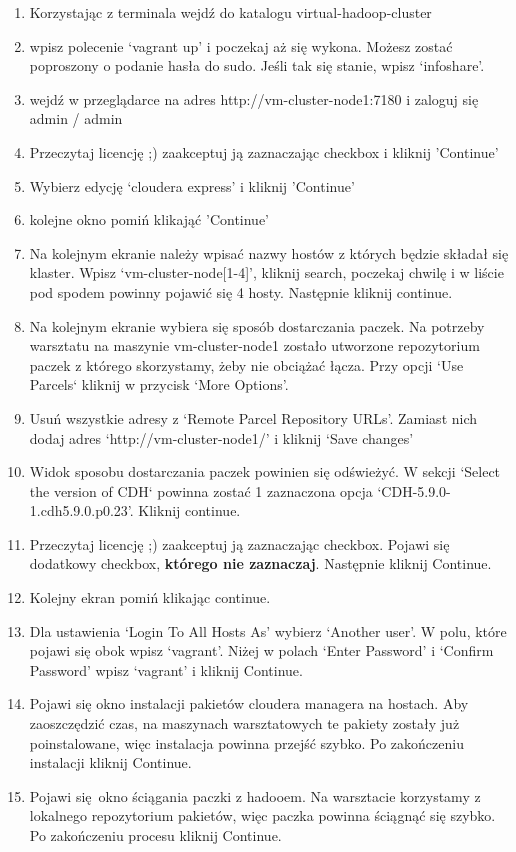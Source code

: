 \documentclass[11pt]{article}
\begin{document}
\begin{enumerate}
\item Korzystając z terminala wejdź do katalogu virtual-hadoop-cluster
\item wpisz polecenie ‘vagrant up’ i poczekaj aż się wykona. Możesz zostać poproszony o podanie hasła do sudo. Jeśli tak się stanie, wpisz ‘infoshare’.
\item wejdź w przeglądarce na adres http://vm-cluster-node1:7180 i zaloguj się admin / admin
\item Przeczytaj licencję ;) zaakceptuj ją zaznaczając checkbox i kliknij 'Continue'
\item Wybierz edycję ‘cloudera express’ i kliknij 'Continue'
\item kolejne okno pomiń klikająć 'Continue'
\item Na kolejnym ekranie należy wpisać nazwy hostów z których będzie składał się klaster. Wpisz ‘vm-cluster-node[1-4]’, kliknij search, poczekaj chwilę i w liście pod spodem powinny pojawić się 4 hosty. Następnie kliknij continue.
\item Na kolejnym ekranie wybiera się sposób dostarczania paczek. Na potrzeby warsztatu na maszynie vm-cluster-node1 zostało utworzone repozytorium paczek z którego skorzystamy, żeby nie obciążać łącza. Przy opcji ‘Use Parcels` kliknij w przycisk ‘More Options’.
\item Usuń wszystkie adresy z ‘Remote Parcel Repository URLs’. Zamiast nich dodaj adres ‘http://vm-cluster-node1/’ i kliknij ‘Save changes’
\item Widok sposobu dostarczania paczek powinien się odświeżyć. W sekcji ‘Select the version of CDH` powinna zostać 1 zaznaczona opcja ‘CDH-5.9.0-1.cdh5.9.0.p0.23’. Kliknij continue.
\item Przeczytaj licencję ;) zaakceptuj ją zaznaczając checkbox. Pojawi się dodatkowy checkbox, \textbf{którego nie zaznaczaj}. Następnie kliknij Continue.
\item Kolejny ekran pomiń klikając continue.
\item Dla ustawienia ‘Login To All Hosts As’ wybierz ‘Another user’. W polu, które pojawi się obok wpisz ‘vagrant’. Niżej w polach ‘Enter Password’ i ‘Confirm Password’ wpisz ‘vagrant’ i kliknij Continue.
\item Pojawi się okno instalacji pakietów cloudera managera na hostach. Aby zaoszczędzić czas, na maszynach warsztatowych te pakiety zostały już poinstalowane, więc instalacja powinna przejść szybko. Po zakończeniu instalacji kliknij Continue.
\item Pojawi się okno ściągania paczki z hadooem. Na warsztacie korzystamy z lokalnego repozytorium pakietów, więc paczka powinna ściągnąć się szybko. Po zakończeniu procesu kliknij Continue.

\end{enumerate}
\end{document}
